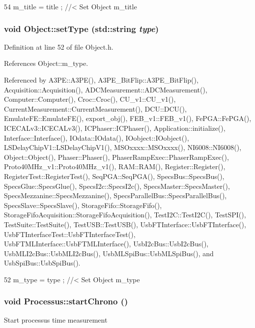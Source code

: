 \begin{DoxyCode}
54 { m_title = title ; } //< Set Object m_title
\end{DoxyCode}
\hypertarget{classObject_aae534cc9d982bcb9b99fd505f2e103a5}{
\subsubsection[{setType}]{\setlength{\rightskip}{0pt plus 5cm}void Object::setType (std::string {\em type})}}
\label{classObject_aae534cc9d982bcb9b99fd505f2e103a5}


Definition at line 52 of file Object.h.

References Object::m\_\-type.

Referenced by A3PE::A3PE(), A3PE\_\-BitFlip::A3PE\_\-BitFlip(), Acquisition::Acquisition(), ADCMeasurement::ADCMeasurement(), Computer::Computer(), Croc::Croc(), CU\_\-v1::CU\_\-v1(), CurrentMeasurement::CurrentMeasurement(), DCU::DCU(), EmulateFE::EmulateFE(), export\_\-obj(), FEB\_\-v1::FEB\_\-v1(), FePGA::FePGA(), ICECALv3::ICECALv3(), ICPhaser::ICPhaser(), Application::initialize(), Interface::Interface(), IOdata::IOdata(), IOobject::IOobject(), LSDelayChipV1::LSDelayChipV1(), MSOxxxx::MSOxxxx(), NI6008::NI6008(), Object::Object(), Phaser::Phaser(), PhaserRampExec::PhaserRampExec(), Proto40MHz\_\-v1::Proto40MHz\_\-v1(), RAM::RAM(), Register::Register(), RegisterTest::RegisterTest(), SeqPGA::SeqPGA(), SpecsBus::SpecsBus(), SpecsGlue::SpecsGlue(), SpecsI2c::SpecsI2c(), SpecsMaster::SpecsMaster(), SpecsMezzanine::SpecsMezzanine(), SpecsParallelBus::SpecsParallelBus(), SpecsSlave::SpecsSlave(), StorageFifo::StorageFifo(), StorageFifoAcquisition::StorageFifoAcquisition(), TestI2C::TestI2C(), TestSPI(), TestSuite::TestSuite(), TestUSB::TestUSB(), UsbFTInterface::UsbFTInterface(), UsbFTInterfaceTest::UsbFTInterfaceTest(), UsbFTMLInterface::UsbFTMLInterface(), UsbI2cBus::UsbI2cBus(), UsbMLI2cBus::UsbMLI2cBus(), UsbMLSpiBus::UsbMLSpiBus(), and UsbSpiBus::UsbSpiBus().


\begin{DoxyCode}
52 { m_type  = type  ; } //< Set Object m_type
\end{DoxyCode}
\hypertarget{classProcessus_a5e4d34b86241fa0756e07375a14ff4b2}{
\subsubsection[{startChrono}]{\setlength{\rightskip}{0pt plus 5cm}void Processus::startChrono ()}}
\label{classProcessus_a5e4d34b86241fa0756e07375a14ff4b2}
Start processus time measurement 

